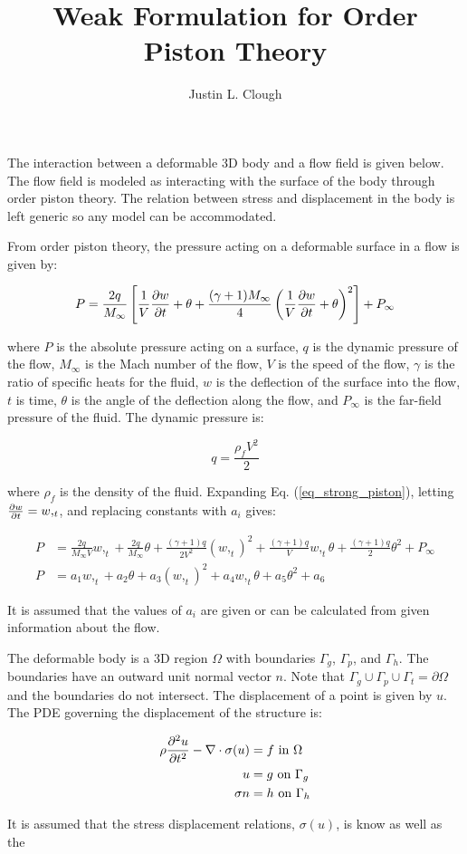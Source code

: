 \documentclass[a4paper, 12pt]{article}
\author{Justin L. Clough}
\title{Weak Formulation for \nth{2} Order Piston Theory}
\begin{document}
\maketitle

The interaction between a deformable 3D body and
a flow field is given below.
The flow field is modeled as interacting with the surface 
of the body through  order piston theory.
The relation between stress and displacement in the body
is left generic so any model can be accommodated.


From  order piston theory, the pressure acting
on a deformable surface in a flow is 
given by:

\begin{equation}
P = \frac{2q}{M_\infty} 
  \left[
    \frac{1}{V} \pdv{w}{t} + \theta 
    + \frac{ (\gamma+1) M_\infty}{4} 
      \left(
        \frac{1}{V} \pdv{w}{t} + \theta
      \right)^2
  \right]
  + P_\infty
  \label{eq_strong_piston}
\end{equation}

\noindent
where 
$P$ is the absolute pressure acting on a surface,
$q$ is the dynamic pressure of the flow, 
$M_\infty$ is the Mach number of the flow,
$V$ is the speed of the flow,
$\gamma$ is the ratio of specific heats for the fluid,
$w$ is the deflection of the surface into the flow,
$t$ is time, 
$\theta$ is the angle of the deflection along the flow,
and
$P_\infty$ is the far-field pressure of the fluid.
The dynamic pressure is:

\begin{equation}
q = \frac{ \rho_f V^2}{2}
\end{equation}

\noindent
where 
$\rho_f$ is the density of the fluid.
Expanding Eq. (\ref{eq_strong_piston}),
letting $\pdv{w}{t}=w,_t$,
and replacing constants with $a_i$ gives:

\begin{align}
P& 
  = \frac{2q}{M_\infty V} w,_t
  + \frac{2q}{M_\infty} \theta
  + \frac{(\gamma +1)q}{2V^2} (w,_t)^2
  + \frac{(\gamma+1)q}{V} w,_t \theta 
  + \frac{(\gamma+1)q}{2} \theta^2
  + P_\infty \\
P& 
  = a_1 w,_t
  + a_2 \theta
  + a_3 (w,_t)^2
  + a_4 w,_t \theta 
  + a_5 \theta^2
  + a_6
\end{align}

\noindent
It is assumed that the values of $a_i$ are given 
or can be calculated from given information about the flow.

The deformable body is a 3D region $\Omega$ with boundaries
$\Gamma_g$, $\Gamma_p$, and $\Gamma_h$.
The boundaries have an outward unit normal vector $n$.
Note that $\Gamma_g \cup \Gamma_p \cup \Gamma_t = \partial \Omega$
and the boundaries do not intersect.
The displacement of a point is given by $u$.
The PDE governing the displacement of the structure is:

\begin{align}
\rho \pdv[2]{u}{t} - \nabla \cdot \sigma(u) &= f \text{ in $\Omega$} \\
u &= g \text{ on $\Gamma_g$} \\
\sigma n &= h \text{ on $\Gamma_h$} \\
\end{align}

\noindent
It is assumed that the stress displacement relations, $\sigma (u)$, is know 
as well as the 
\end{document}
